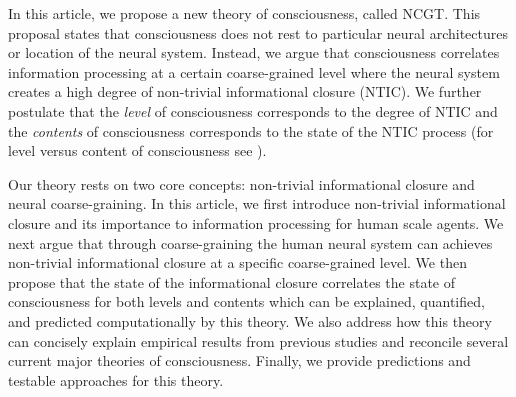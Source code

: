 \documentclass[utf8]{article}
\newcommand{\tname}{NCGT} 	%
\newcommand{\includegraphicsTodo}[2][]{%
			\tcbox[%
				adjusted title=\LARGE To Be Modified,
				halign title=right,
				colbacktitle=Orange!75!White,
				coltitle=Black,
				colframe=Red!60!White,
				boxrule=1mm,
				colback=white%
				]{\texttt{[image: \#2]}}}
\begin{document}
		
		In this article, we propose a new theory of consciousness, called \ac{\tname}. This proposal states that consciousness does not rest to particular neural architectures or location of the neural system. Instead, we argue that consciousness correlates information processing at a certain coarse-grained level where the neural system creates a high degree of non-trivial informational closure (NTIC). We further postulate that the \textit{level} of consciousness corresponds to the degree of NTIC and the \textit{contents} of consciousness corresponds to the state of the NTIC process (for level versus content of consciousness see \cite{laureys2005neural, overgaard2010neural}).
			
		Our theory rests on two core concepts: non-trivial informational closure and neural coarse-graining. In this article, we first introduce non-trivial informational closure and its importance to information processing for human scale agents. We next argue that through coarse-graining the human neural system can achieves non-trivial informational closure at a specific coarse-grained level. We then propose that the state of the informational closure correlates the state of consciousness for both levels and contents which can be explained, quantified, and predicted computationally by this theory. We also address how this theory can concisely explain empirical results from previous studies and reconcile several current major theories of consciousness. Finally, we provide predictions and testable approaches for this theory.
		
				
				
	
		
\end{document}
